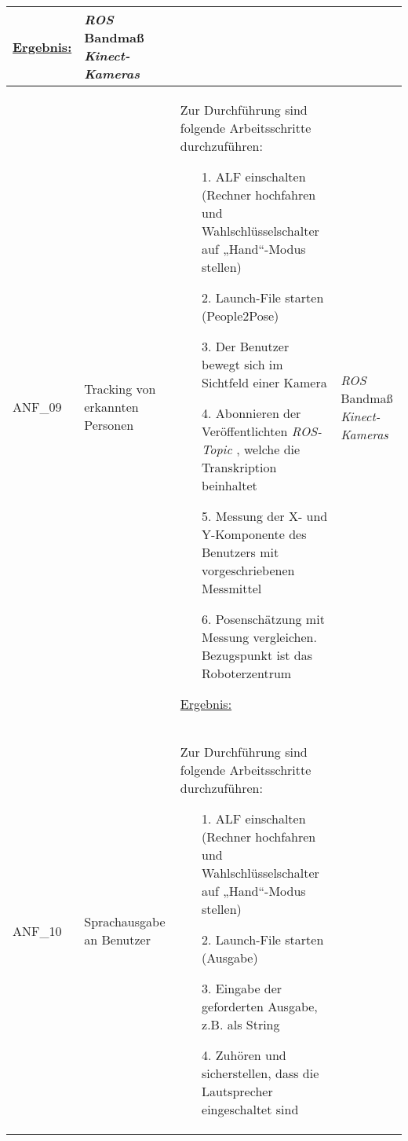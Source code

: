 \documentclass[12pt,a4paper,oneside,numbers=noenddot,captions=tableheading,toc=bibliography,openany,tikz,margin=5mm]{scrbook}
\begin{document}
\begin{longtable}{|p{}|p{}|p{7cm}|p{}|}
\begin{itemize}
	\end{itemize}
	
	\underline{Ergebnis:}\newline
	\newline
	
	\textbf{}	%
	& \textit{ROS}\newline
	Bandmaß\newline
	\textit{Kinect-Kameras}
	\\
	\hline
	
	ANF\_09 & Tracking von erkannten Personen & Zur Durchführung sind folgende Arbeitsschritte durchzuführen:
	\begin{itemize}
		\item[1.]	ALF einschalten (Rechner hochfahren und Wahlschlüsselschalter auf „Hand“-Modus stellen)
		\item[2.]	Launch-File starten (People2Pose)
		\item[3.]	Der Benutzer bewegt sich im Sichtfeld einer Kamera
		\item[4.]Abonnieren der Veröffentlichten \textit{ROS-Topic} , welche die Transkription beinhaltet 
		\item[5.]	Messung der X- und Y-Komponente des Benutzers mit vorgeschriebenen Messmittel
		\item[6.]	Posenschätzung mit Messung vergleichen. Bezugspunkt ist das Roboterzentrum
	\end{itemize}
	
	\underline{Ergebnis:}\newline
	\newline
	
	\textbf{}%
	& \textit{ROS}\newline
	Bandmaß\newline
	\textit{Kinect-Kameras}
	\\
	\hline
	
		ANF\_10 & Sprachausgabe an Benutzer & Zur Durchführung sind folgende Arbeitsschritte durchzuführen:
	\begin{itemize}
		\item[1.]	ALF einschalten (Rechner hochfahren und Wahlschlüsselschalter auf „Hand“-Modus stellen)
		\item[2.]	Launch-File starten (Ausgabe)
		\item[3.]	Eingabe der geforderten Ausgabe, z.B. als String
		\item[4.]	Zuhören und sicherstellen, dass die Lautsprecher eingeschaltet sind
	\end{itemize}
	

\end{longtable}
\end{document}
